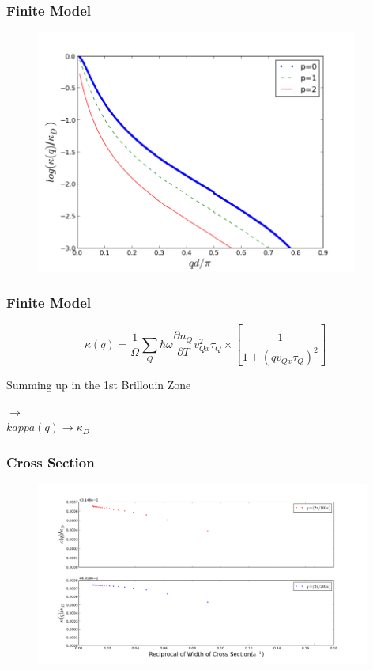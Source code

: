 \documentclass{beamer}
\begin{document}
\begin{frame}
\frametitle{Finite Model}
\begin{figure}
    \centering
    \includegraphics[height=8cm]{BZ.png}
\end{figure}
\end{frame}

\begin{frame}
\frametitle{Finite Model}
\centering
\begin{equation*}
\kappa(q)=\frac{1}{\Omega}\sum\limits_{Q}\hbar\omega\frac{\partial n_Q}{\partial T}v_{Qx}^2\tau_Q\times[\frac{1}{1+(qv_{Qx}\tau_Q)^2}]
\end{equation*}

Summing up in the 1st Brillouin Zone \\
\begin{center}
$\longrightarrow$ \\
$kappa(q) \rightarrow \kappa_D$
\end{center}
\end{frame}

\begin{frame}
\frametitle{Cross Section}
\begin{figure}
    \centering
    \includegraphics[height=6cm]{Cross.png}
\end{figure}
\end{frame}
\end{document}
